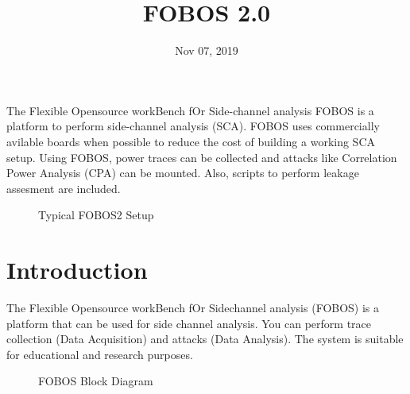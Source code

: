 \documentclass[letterpaper,10pt,english]{sphinxmanual}
\title{FOBOS 2.0}
\date{Nov 07, 2019}
\author{}
\let\sphinxpxdimen\pdfpxdimen\else\newdimen\sphinxpxdimen
\begin{document}
\pagestyle{empty}
\sphinxmaketitle
\pagestyle{plain}
\sphinxtableofcontents
\pagestyle{normal}
\label{\detokenize{index::doc}}


The Flexible Opensource workBench fOr Side-channel analysis FOBOS is a platform to perform side-channel analysis (SCA).
FOBOS uses commercially avilable boards when possible to reduce the cost of building a working SCA setup.
Using FOBOS, power traces can be collected and attacks like Correlation Power Analysis (CPA) can be mounted.
Also, scripts to perform leakage assesment are included.

\begin{figure}[htbp]
\centering
\capstart

\noindent\sphinxincludegraphics[height=350\sphinxpxdimen]{{fobos2}.jpg}
\caption{Typical FOBOS2 Setup}\label{\detokenize{index:id1}}\end{figure}


\chapter{Introduction}
\label{\detokenize{introduction:introduction}}\label{\detokenize{introduction::doc}}
The Flexible Opensource workBench fOr Sidechannel analysis (FOBOS) is a platform that
can be used for side channel analysis.
You can perform trace collection (Data Acquisition) and attacks (Data Analysis).
The system is suitable for educational and research purposes.

\begin{figure}[htbp]
\centering
\capstart

\noindent{}
\caption{FOBOS Block Diagram}\label{\detokenize{introduction:id1}}\end{figure}
\end{document}
